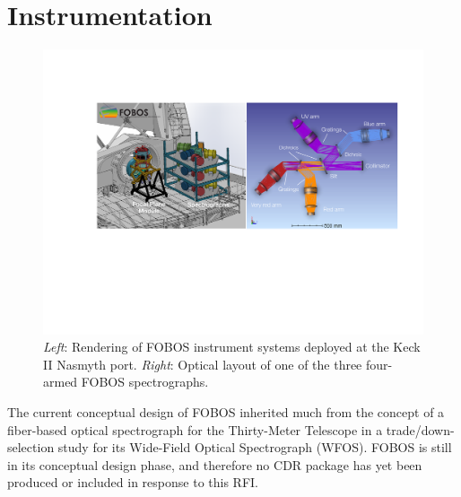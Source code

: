 \documentclass[oneside,11pt]{amsart}
\begin{document}
\section{Instrumentation}

\begin{figure}[h!]
\vskip -0.1in
\includegraphics[width=\textwidth]{FOBOS_inst_2019-10-28.pdf}
\caption{\small {\it Left}: Rendering of FOBOS instrument systems
deployed at the Keck II Nasmyth port. {\it Right}: Optical layout of
one of the three four-armed FOBOS spectrographs.}
\label{fig:layout}
\end{figure}



The current conceptual design of FOBOS inherited much from the
concept of a fiber-based optical spectrograph for the Thirty-Meter
Telescope in a trade/down-selection study for its Wide-Field Optical
Spectrograph (WFOS). FOBOS is still in its conceptual design phase,
and therefore no CDR package has yet been produced or included in
response to this RFI.
\end{document}
